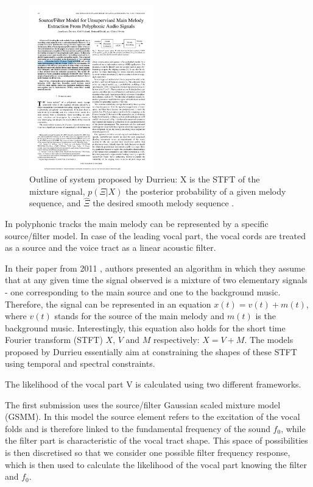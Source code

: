 \begin{figure}
  \vspace{-50pt}

  \begin{center}
    \includegraphics[width=0.48\textwidth]{Figures/durrieudiagram}
  \end{center}
  \caption{Outline of system proposed by Durrieu: X is the STFT of the mixture signal, $p(\Xi|X)$ the posterior probability of a given melody sequence, and $\hat{\Xi} $ the desired smooth melody sequence \cite{durrieu}.}
  \label{fig:durrieu}
\end{figure}


In polyphonic tracks the main melody can be represented by a specific source/filter model. In case of the leading vocal part, the vocal cords are treated as a source and the voice tract as a linear acoustic filter.

In their paper from 2011 \cite{durrieu}, authors presented an algorithm in which they assume that at any given time the signal observed is a mixture of two elementary signals - one corresponding to the main source and one to the background music. Therefore, the signal can be represented in an equation $x(t) = v(t) + m(t)$, where $v(t)$ stands for the source of the main melody and $m(t)$ is the background music. Interestingly, this equation also holds for the short time Fourier transform (STFT)  $X$, $V$ and $M$ respectively: $X = V + M$. The models proposed by Durrieu essentially aim at constraining the shapes of these STFT using temporal and spectral constraints. 


The likelihood of the vocal part V is calculated using two different frameworks. 

The first submission uses the source/filter Gaussian scaled mixture model (GSMM). In this model the source element refers to the excitation of the vocal folds and is therefore linked to the fundamental frequency of the sound $f_{\text{0}}$, while the filter part is characteristic of the vocal tract shape. This space of possibilities is then discretised so that we consider one possible filter frequency response, which is then used to calculate the likelihood of the vocal part knowing the filter and $f_{\text{0}}$.

